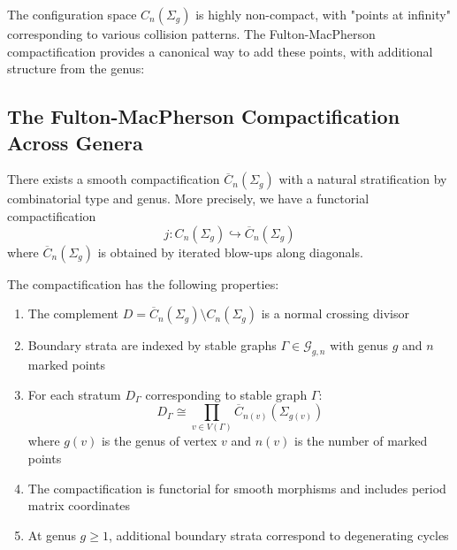 The configuration space $C_n(\Sigma_g)$ is highly non-compact, with "points at infinity" corresponding to various collision patterns. The Fulton-MacPherson compactification provides a canonical way to add these points, with additional structure from the genus:
 
\subsection{The Fulton-MacPherson Compactification Across Genera}
 
\begin{theorem}\label{thm:FM}
There exists a smooth compactification $\overline{C}_n(\Sigma_g)$ with a natural stratification by combinatorial type and genus. More precisely, we have
a functorial compactification
\[j: C_n(\Sigma_g) \hookrightarrow \overline{C}_n(\Sigma_g)\]
where $\overline{C}_n(\Sigma_g)$ is obtained by iterated blow-ups along diagonals.

The compactification has the following properties:
\begin{enumerate}
\item The complement $D = \overline{C}_n(\Sigma_g) \setminus C_n(\Sigma_g)$ is a normal crossing divisor
\item Boundary strata are indexed by stable graphs $\Gamma \in \mathcal{G}_{g,n}$ with genus $g$ and $n$ marked points
\item For each stratum $D_\Gamma$ corresponding to stable graph $\Gamma$:
\[
D_\Gamma \cong \prod_{v \in V(\Gamma)} \overline{C}_{n(v)}(\Sigma_{g(v)})
\]
where $g(v)$ is the genus of vertex $v$ and $n(v)$ is the number of marked points
\item The compactification is functorial for smooth morphisms and includes period matrix coordinates
\item At genus $g \geq 1$, additional boundary strata correspond to degenerating cycles
\end{enumerate}
\end{theorem}
 
